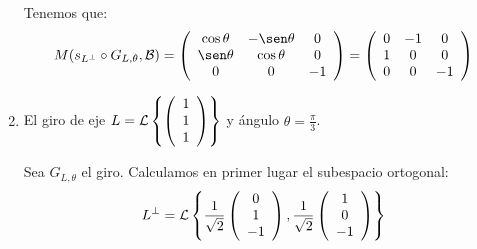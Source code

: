 \begin{ejercicio}
\begin{enumerate}
        Tenemos que:
        \begin{equation*}
            M(s_{L^\perp}\circ G_{L,\theta},\cc{B})=\left(\begin{array}{ccc}
                \cos \theta & -\sen \theta & 0 \\
                \sen \theta & \cos \theta & 0\\
                0& 0& -1
            \end{array}\right)
            = \left(\begin{array}{ccc}
                0 & -1 & 0 \\
                1 & 0 & 0\\
                0& 0& -1
            \end{array}\right)
        \end{equation*}
        
        \item El giro de eje $L=\mathcal{L}\left\{\left(\begin{array}{c}
                     1 \\ 1 \\ 1
                \end{array}\right)\right\}$ y ángulo $\displaystyle \theta=\frac{\pi}{3}$.

        Sea $G_{L,\theta}$ el giro. Calculamos en primer lugar el subespacio ortogonal:
        \begin{equation*}
            L^\perp = \mathcal{L}\left\{
            \frac{1}{\sqrt{2}} \left(\begin{array}{c}
                 0 \\ 1 \\ -1
            \end{array}\right),
            \frac{1}{\sqrt{2}}
            \left(\begin{array}{c}
                 1 \\ 0 \\ -1
            \end{array}\right)
            \right\}
        \end{equation*}
        

\end{enumerate}
\end{ejercicio}
